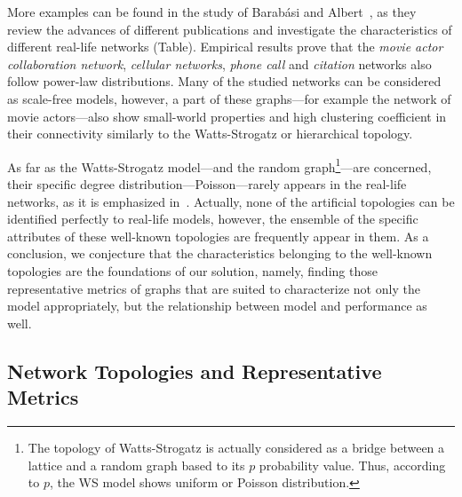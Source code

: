 
More examples can be found in the study of Barabási and Albert~\cite{statistical_mechanics}, as they review the advances of different publications and investigate the characteristics of different real-life networks (Table). Empirical results prove that the \textit{movie actor collaboration network}, \textit{cellular networks}, \textit{phone call} and \textit{citation} networks also follow power-law distributions. Many of the studied networks can be considered as scale-free models, however, a part of these graphs---for example the network of movie actors---also show small-world properties and high clustering coefficient in their connectivity similarly to the Watts-Strogatz or hierarchical topology.

As far as the Watts-Strogatz model---and the random graph\footnote{The topology of Watts-Strogatz is actually considered as a bridge between a lattice and a random graph based to its $p$ probability value. Thus, according to $p$, the WS model shows uniform or Poisson distribution.}---are concerned, their specific degree distribution---Poisson---rarely appears in the real-life networks, as it is emphasized in~\cite{random_study}. Actually, none of the artificial topologies can be identified perfectly to real-life models, however, the ensemble of the specific attributes of these well-known topologies are frequently appear in them. As a conclusion, we conjecture that the characteristics belonging to the well-known topologies are the foundations of our solution, namely, finding those representative metrics of graphs that are suited to characterize not only the model appropriately, but the relationship between model and performance as well.

\subsection{Network Topologies and Representative Metrics}

